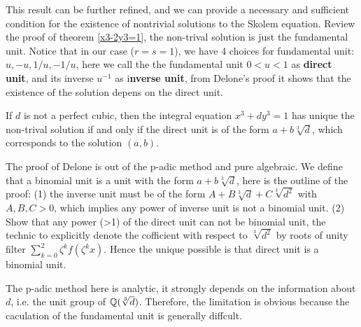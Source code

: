 This result can be further refined, and we can provide a necessary and sufficient condition for the existence of nontrivial solutions to the Skolem equation. Review the proof of theorem \ref{x3-2y3=1}, the non-trival 
solution is just the fundamental unit. Notice that in our case (\(r=s=1\)), we have 4 choices for fundamental unit: \(u,-u,1/u,-1/u\), here we call the the fundamental unit \(0<u<1\) as \textbf{direct unit}, and its inverse \(u^{-1}\) as i\textbf{nverse unit}, from Delone's proof \cite[Chapter 11]{delone1964theory} it shows that the existence of the solution depens on the direct unit.

\begin{theorem}[Delone]
    If \(d\) is not a perfect cubic, then the integral equation \(x^3+dy^3=1\) has unique the non-trival solution if and only if the direct unit is of the form \(a+b\sqrt[3]{d}\), which corresponds to the solution \((a,b)\).
\end{theorem}

The proof of Delone is out of the p-adic method and pure algebraic. We define that a binomial unit is a unit with the form \(a+b\sqrt[3]{d}\), here is the outline of the proof: (1) the inverse unit must be of the form \(A+B\sqrt[3]{d}+C\sqrt[3]{d^2}\) with \(A,B,C>0\), which implies any power of inverse unit is not a binomial unit. (2) Show that any power (>1) of the direct unit can not be binomial unit, the technic to explicitly denote the cofficient with respect to \(\sqrt[3]{d^2}\) by roots of unity filter \(\sum_{k=0}^{2} \zeta^k f(\zeta^k x)\). Hence the unique possible is that direct unit is a binomial unit.

The p-adic method here is analytic, it strongly depends on the information about \(d\), i.e. the unit group of \(\mathbb{Q}(\sqrt[3]{d})\). Therefore, the limitation is obvious because the caculation of the fundamental unit is generally diffcult.